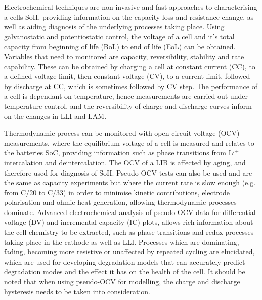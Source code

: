 \documentclass[journal=jacsat,manuscript=article]{achemso}
\begin{document}
Electrochemical techniques are non-invasive and fast approaches to characterising a cells SoH, providing information on the capacity loss and resistance change, as well as aiding diagnosis of the underlying processes taking place. Using galvanostatic and potentiostatic control, the voltage of a cell and it's total capacity from beginning of life (BoL) to end of life (EoL) can be obtained. Variables that need to monitored are capacity, reversibility, stability and rate capability. These can be obtained by charging a cell at constant current (CC), to a defined voltage limit, then constant voltage (CV), to a current limit, followed by discharge at CC, which is sometimes followed by CV step. The performance of a cell is dependant on temperature, hence measurements are carried out under temperature control, and the reversibility of charge and discharge curves inform on the changes in LLI and LAM.\cite{Birkl2017}

Thermodynamic process can be monitored with open circuit voltage (OCV) measurements, where the equilibrium voltage of a cell is measured and relates to the batteries SoC, providing information such as phase transitions from Li$^{+}$ intercalation and deintercalation. The OCV of a LIB is affected by aging, and therefore used for diagnosis of SoH. Pseudo-OCV tests can also be used and are the same as capacity experiments but where the current rate is slow enough (e.g. from C/20 to C/33) in order to minimise kinetic contributions, electrode polarisation and ohmic heat generation, allowing thermodynamic processes dominate.\cite{Bloom2005} Advanced electrochemical analysis of pseudo-OCV data for differential voltage (DV) and incremental capacity (IC) plots, allows rich information about the cell chemistry to be extracted, such as phase transitions and redox processes taking place in the cathode as well as LLI.\cite{Bloom2005} Processes which are dominating, fading, becoming more resistive or unaffected by repeated cycling are elucidated, which are used for developing degradation models that can accurately predict degradation modes and the effect it has on the health of the cell.\cite{Barai2019}  It should be noted that when using pseudo-OCV for modelling, the charge and discharge hysteresis needs to be taken into consideration.\cite{Garcia-Plaza2017}
\end{document}
